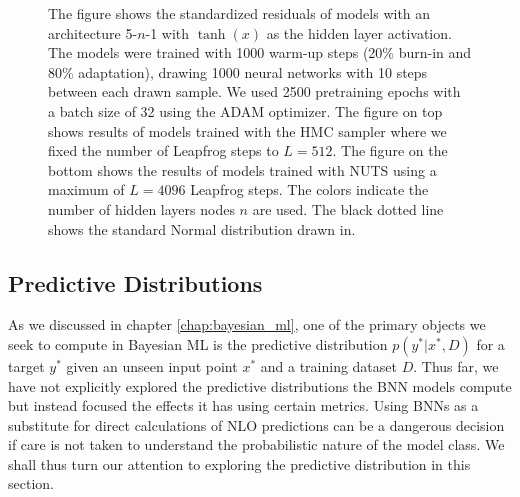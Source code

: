 \begin{figure}[H]
    \caption{
        The figure shows the standardized residuals of models with an architecture 5-$n$-1 with $\tanh(x)$ as the hidden layer activation. The models were trained with 1000 warm-up steps (20\% burn-in and 80\% adaptation), drawing 1000 neural networks with 10 steps between each drawn sample. We used 2500 pretraining epochs with a batch size of 32 using the ADAM optimizer. The figure on top shows results of models trained with the HMC sampler where we fixed the number of Leapfrog steps to $L = 512$. The figure on the bottom shows the results of models trained with NUTS using a maximum of $L = 4096$ Leapfrog steps. The colors indicate the number of hidden layers nodes $n$ are used. The black dotted line shows the standard Normal distribution drawn in.
    }
    \label{fig:standardized_residual_vs_params}
\end{figure}

\subsection{Predictive Distributions}
As we discussed in chapter \ref{chap:bayesian_ml}, one of the primary objects we seek to compute
in Bayesian ML is the predictive distribution $p(y^*|x^*, D)$ for a target $y^*$ given an unseen input point $x^*$ and
a training dataset $D$. Thus far, we have not explicitly explored the predictive distributions the BNN models compute but instead focused the effects it has using certain metrics. Using BNNs as a substitute for direct calculations of NLO predictions can be a dangerous decision if care is not taken to understand the probabilistic nature of the model class. We shall thus turn our attention to exploring the predictive distribution in this section.

